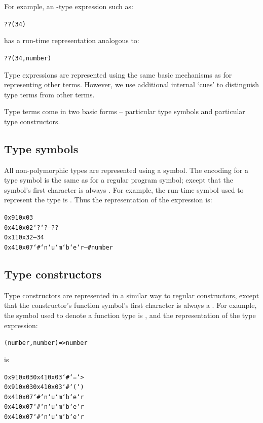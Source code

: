 For example, an -type expression such as:
\begin{alltt}
??(34)
\end{alltt}
has a run-time representation analogous to:
\begin{alltt}
??(34,number)
\end{alltt}

Type expressions are represented using the same basic mechanisms as for representing other terms. However, we use additional internal `cues' to distinguish type terms from other terms. 

Type terms come in two basic forms -- particular type symbols and particular type constructors. 

\subsection{Type symbols}
\label{encoded:type:symbol}

All non-polymorphic types are represented using a symbol. The encoding for a type symbol is the same as for a regular program symbol; except that the symbol's first character is always \q{\hash}. For example, the run-time symbol used to represent the  type is . Thus the representation of the expression  is:

\begin{alltt}
0x91 0x03
     0x41 0x02 `? `?               -- ??
     0x11 0x32                     -- 34
     0x41 0x07 `# `n `u `m `b `e `r -- #number
\end{alltt}

\subsection{Type constructors}
\label{encoded:type:constructor}

Type constructors are represented in a similar way to regular constructors, except that the constructor's function symbol's first character is always a \q{\hash}. For example, the symbol used to denote a function type is \q{\hash{}=>}, and the representation of the type expression:
\begin{alltt}
(number,number) => number
\end{alltt}
is
\begin{alltt}
0x91 0x03 0x41 0x03 `# `= `>
     0x91 0x03 0x41 0x03 `# `( `)
               0x41 0x07 `# `n `u `m `b `e `r
               0x41 0x07 `# `n `u `m `b `e `r
     0x41 0x07 `# `n `u `m `b `e `r
\end{alltt}

